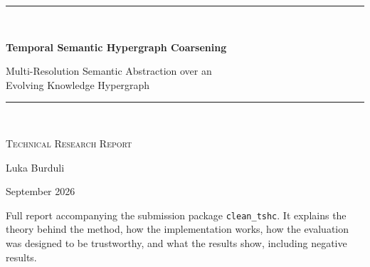 \documentclass[11pt,a4paper]{article}
\theoremstyle{remark}
\newcommand{\code}[1]{\texttt{\small #1}}
\begin{document}

\begin{titlepage}
\centering
\vspace*{2.5cm}
{\color{accent}\rule{\linewidth}{1.2pt}}\\[0.8cm]
{\Huge\bfseries Temporal Semantic Hypergraph Coarsening\par}
\vspace{0.5cm}
{\Large Multi-Resolution Semantic Abstraction over an\\ Evolving Knowledge Hypergraph\par}
\vspace{0.6cm}
{\color{accent}\rule{\linewidth}{1.2pt}}\\[1.6cm]
{\large\textsc{Technical Research Report}\par}
\vspace{2.2cm}
{\Large Luka Burduli\par}
\vspace{0.4cm}
{\large September 2026\par}
\vfill
\begin{minipage}{0.82\linewidth}
\small\centering
Full report accompanying the submission package \code{clean\_tshc}.
It explains the theory behind the method, how the implementation works,
how the evaluation was designed to be trustworthy, and what the results show,
including negative results.
\end{minipage}
\vspace{1.5cm}
\end{titlepage}
\end{document}
